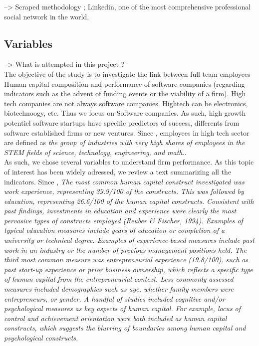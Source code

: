 \begin{itemize}
\begin{itemize}
--> Scraped methodology ; Linkedin, one of the most comprehensive professional social network in the world,

\subsection{Variables}

--> What is attempted in this project ?\\

The objective of the study is to investigate the link between full team employees Human capital composition and performance of software companies (regarding indicators such as the advent of funding events or the viability of a firm). High tech companies are not always software companies. Hightech can be electronics, biotechnoogy, etc. Thus we focus on Software companies. As such, high growth potentiel software startups have specific predictors of success, differents from software established firms or new ventures. Since \citep{hathaway2013tech}, employees in high tech sector are defined as \textit{the group of industries with very high shares of employees in the STEM fields of science, technology, engineering, and math.}. \\

As such, we chose several variables to understand firm performance. As this topic of interest has been widely adressed, we review a text summarizing all the indicators. Since \citep{marvel2016human}, \textit{The most common human capital construct investigated was work experience, representing 39.9/100 of the constructs. This was followed by education, representing 26.6/100 of the human capital constructs. Consistent with past findings, investments in education and experience were clearly the most pervasive types of constructs employed (Reuber & Fischer, 1994). Examples of typical education measures include years of education or completion of a university or technical degree. Examples of experience-based measures include past work in an industry or the number of previous management positions held. The third most common measure was entrepreneurial experience (19.8/100), such as past start-up experience or prior business ownership, which reflects a specific type of human capital from the entrepreneurial context. Less commonly assessed measures included demographics such as age, whether family members were entrepreneurs, or gender. A handful of studies included cognitive and/or psychological measures as key aspects of human capital. For example, locus of control and achievement orientation were both included as human capital constructs, which suggests the blurring of boundaries among human capital and psychological constructs.}\\


\end{itemize}
\end{itemize}
